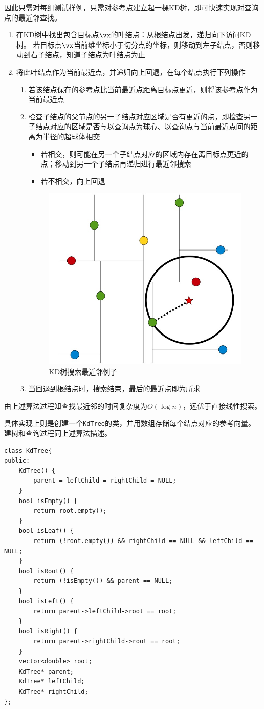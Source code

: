 \documentclass[logo,reportComp]{thesis}
\begin{document}
因此只需对每组测试样例，只需对参考点建立起一棵KD树，即可快速实现对查询点的最近邻查找。
\begin{enumerate}
	\item 在KD树中找出包含目标点$\vx$的叶结点：从根结点出发，递归向下访问KD树。
	若目标点$\vx$当前维坐标小于切分点的坐标，则移动到左子结点，否则移动到右子结点，知道子结点为叶结点为止
	\item 将此叶结点作为当前最近点，并递归向上回退，在每个结点执行下列操作
	\begin{enumerate}
		\item 若该结点保存的参考点比当前最近点距离目标点更近，则将该参考点作为当前最近点
		\item 检查子结点的父节点的另一子结点对应区域是否有更近的点，即检查另一子结点对应的区域是否与以查询点为球心、以查询点与当前最近点间的距离为半径的超球体相交
		\begin{itemize}
			\item 若相交，则可能在另一个子结点对应的区域内存在离目标点更近的点；移动到另一个子结点再递归进行最近邻搜索
			\item 若不相交，向上回退
		\end{itemize}
		\begin{figure}[H]
		\centering
		\includegraphics[width=0.5\linewidth]{fig/nn_search.jpg}
		\caption{KD树搜索最近邻例子}
		\end{figure}
		\item 当回退到根结点时，搜索结束，最后的最近点即为所求
	\end{enumerate}
\end{enumerate}
由上述算法过程知查找最近邻的时间复杂度为$O(\log n)$，远优于直接线性搜索。

具体实现上则是创建一个\verb'KdTree'的类，并用数组存储每个结点对应的参考向量。
建树和查询过程同上述算法描述。
\begin{lstlisting}
class KdTree{
public:
    KdTree() {
        parent = leftChild = rightChild = NULL;
    }
    bool isEmpty() {
        return root.empty();
    }
    bool isLeaf() {
        return (!root.empty()) && rightChild == NULL && leftChild == NULL;
    }
    bool isRoot() {
        return (!isEmpty()) && parent == NULL;
    }
    bool isLeft() {
        return parent->leftChild->root == root;
    }
    bool isRight() {
        return parent->rightChild->root == root;
    }
    vector<double> root;
    KdTree* parent;
    KdTree* leftChild;
    KdTree* rightChild;
};
\end{lstlisting}
\end{document}
